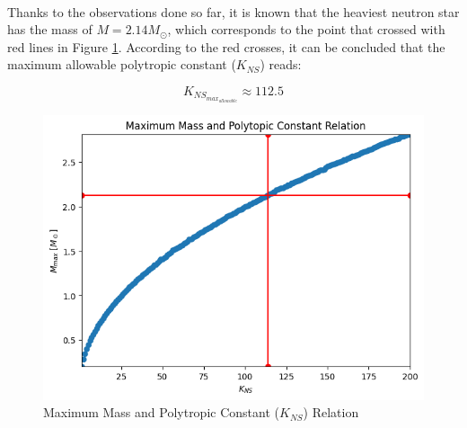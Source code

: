 \documentclass[letterpaper,12pt]{article}
\begin{document}
\paragraph{} Thanks to the observations done so far, it is known that the heaviest neutron star has the mass of $M = 2.14 M_\odot$, which corresponds to the point that crossed with red lines in Figure \ref{fig:20}. According to the red crosses, it can be concluded that the maximum allowable polytropic constant ($K_{NS}$) reads:

\begin{equation*}
    K_{NS_{max_{allowable}}} \approx 112.5
\end{equation*}
\begin{figure}[H] 
\centering \includegraphics[width=0.7\columnwidth]{figures/20_e_s_m_k.png}           
\caption{Maximum Mass and Polytropic Constant ($K_{NS}$) Relation}                
\label{fig:20}
\end{figure}
\end{document}
